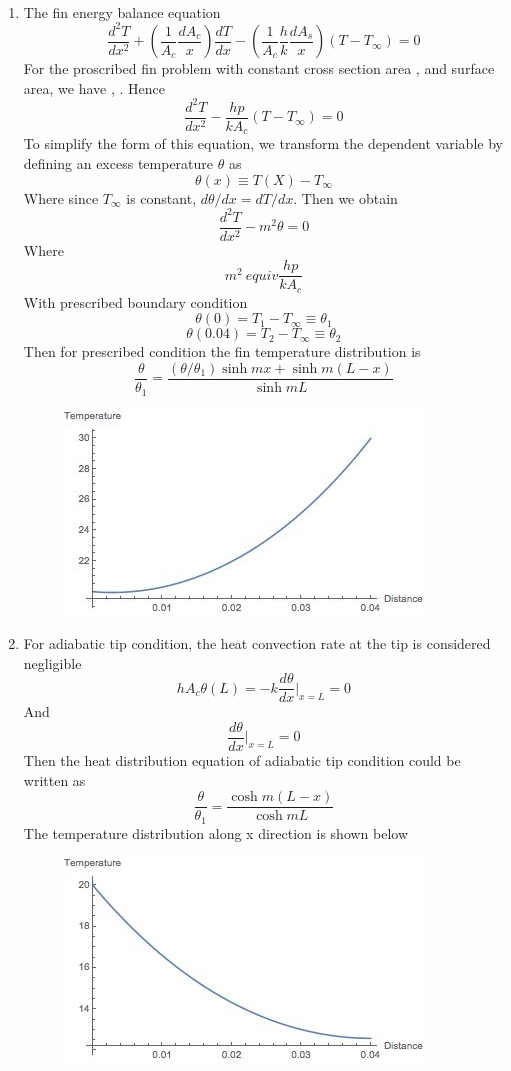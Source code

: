 \begin{solution}
~
\begin{enumerate}
\item
The fin energy balance equation
$$
\frac{d^2 T}{dx^2} + 
\left(\frac{1}{A_c}\frac{dA_c}{x}\right)\frac{dT}{dx}-
\left(\frac{1}{A_c}\frac{h}{k}\frac{dA_s}{x}\right)(T-T_\infty)=0
$$
For the proscribed fin problem with constant cross section area  , 
and surface area, we have   ,   . Hence 
$$
\frac{d^2 T}{dx^2}-
\frac{hp}{kA_c}(T-T_\infty)=0
$$
To simplify the form of this equation, we transform the dependent variable by 
defining an excess temperature $\theta$ as
$$\theta(x) \equiv T(X)-T_\infty$$
Where since $T_\infty$ is constant, $d\theta/dx=dT/dx$. Then we obtain
$$\frac{d^2 T}{dx^2}-m^2\theta=0$$
Where
$$m^2 \ equiv \frac{hp}{kA_c}$$
With prescribed boundary condition
$$\theta(0)=T_1-T_\infty \equiv \theta_1$$
$$\theta(0.04)=T_2-T_\infty \equiv \theta_2$$
Then for prescribed condition the fin temperature distribution is
$$
\frac{\theta}{\theta_1}=
\frac{(\theta/\theta_1)\sinh mx+\sinh m(L-x)}{\sinh mL}
$$
\begin{figure}[h!]
  \centering
    \includegraphics[scale=0.6]{figures/ch2/13}
\end{figure}
\item
For adiabatic tip condition, the heat convection rate at the tip is considered negligible
$$hA_c\theta(L)=-k\frac{d\theta}{dx}|_{x=L}=0$$
And
$$\frac{d\theta}{dx}|_{x=L}=0$$
Then the heat distribution equation of adiabatic tip condition could be written as
$$\frac{\theta}{\theta_1}=
\frac{\cosh m(L-x)}{\cosh mL}
$$
The temperature distribution along x direction is shown below
\begin{figure}[h!]
  \centering
    \includegraphics[scale=0.6]{figures/ch2/14}

\end{figure}
\end{enumerate}
\end{solution}
